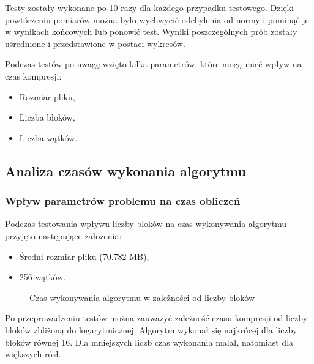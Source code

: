 \documentclass[12pt,a4paper,titlepage]{article}
\begin{document}
Testy zostały wykonane po 10 razy dla każdego przypadku testowego. Dzięki powtórzeniu pomiarów można było wychwycić odchylenia od normy i pominąć je w wynikach końcowych lub ponowić test. Wyniki poszczególnych prób zostały uśrednione i przedstawione w postaci wykresów.\newline

Podczas testów po uwagę wzięto kilka parametrów, które mogą mieć wpływ na czas kompresji:
\begin{itemize}
    \item Rozmiar pliku,
    \item Liczba bloków,
    \item Liczba wątków.
\end{itemize}

\subsection{Analiza czasów wykonania algorytmu}
\subsubsection{Wpływ parametrów problemu na czas obliczeń}
Podczas testowania wpływu liczby bloków na czas wykonywania algorytmu przyjęto następujące założenia:
\begin{itemize}
    \item Średni rozmiar pliku (70.782 MB),
    \item 256 wątków.
\end{itemize}

\begin{figure}[H]
\centering
\caption{Czas wykonywania algorytmu w zależności od liczby bloków}
\end{figure}

Po przeprowadzeniu testów można zauważyć zależność czasu kompresji od liczby bloków zbliżoną do logarytmicznej. Algorytm wykonał się najkrócej dla liczby bloków równej 16. Dla mniejszych liczb czas wykonania malał, natomiast dla większych rósł.\newline
\end{document}

